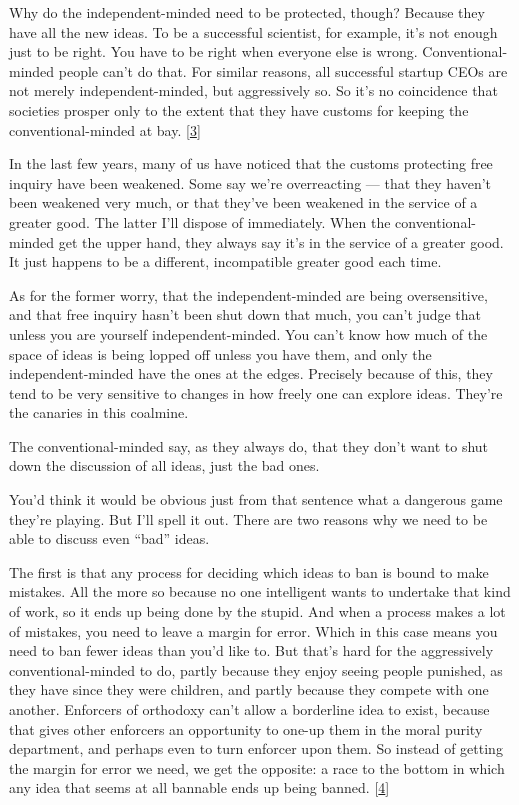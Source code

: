Why do the independent-minded need to be protected, though? Because they
have all the new ideas. To be a successful scientist, for example, it's
not enough just to be right. You have to be right when everyone else is
wrong. Conventional-minded people can't do that. For similar reasons,
all successful startup CEOs are not merely independent-minded, but
aggressively so. So it's no coincidence that societies prosper only to
the extent that they have customs for keeping the conventional-minded at
bay. {[}\hyperref[f3n]{3}{]}

In the last few years, many of us have noticed that the customs
protecting free inquiry have been weakened. Some say we're overreacting
--- that they haven't been weakened very much, or that they've been
weakened in the service of a greater good. The latter I'll dispose of
immediately. When the conventional-minded get the upper hand, they
always say it's in the service of a greater good. It just happens to be
a different, incompatible greater good each time.

As for the former worry, that the independent-minded are being
oversensitive, and that free inquiry hasn't been shut down that much,
you can't judge that unless you are yourself independent-minded. You
can't know how much of the space of ideas is being lopped off unless you
have them, and only the independent-minded have the ones at the edges.
Precisely because of this, they tend to be very sensitive to changes in
how freely one can explore ideas. They're the canaries in this coalmine.

The conventional-minded say, as they always do, that they don't want to
shut down the discussion of all ideas, just the bad ones.

You'd think it would be obvious just from that sentence what a dangerous
game they're playing. But I'll spell it out. There are two reasons why
we need to be able to discuss even ``bad'' ideas.

The first is that any process for deciding which ideas to ban is bound
to make mistakes. All the more so because no one intelligent wants to
undertake that kind of work, so it ends up being done by the stupid. And
when a process makes a lot of mistakes, you need to leave a margin for
error. Which in this case means you need to ban fewer ideas than you'd
like to. But that's hard for the aggressively conventional-minded to do,
partly because they enjoy seeing people punished, as they have since
they were children, and partly because they compete with one another.
Enforcers of orthodoxy can't allow a borderline idea to exist, because
that gives other enforcers an opportunity to one-up them in the moral
purity department, and perhaps even to turn enforcer upon them. So
instead of getting the margin for error we need, we get the opposite: a
race to the bottom in which any idea that seems at all bannable ends up
being banned. {[}\hyperref[f4n]{4}{]}

